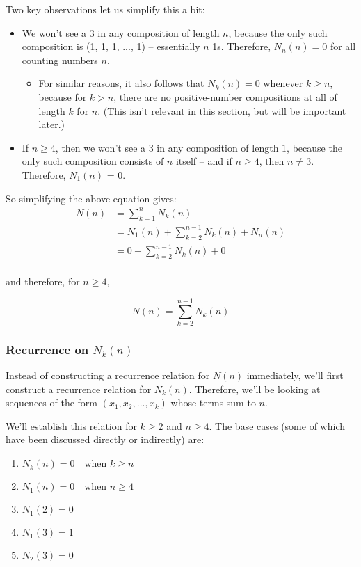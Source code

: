 Two key observations let us simplify this a bit:

\begin{itemize}
\item We won't see a 3 in any composition of length $n$, because the only such composition is (1, 1, 1, ..., 1) -- essentially $n$ 1s. Therefore, $N_n(n) = 0$ for all counting numbers $n$.
\begin{itemize}
\item For similar reasons, it also follows that $N_k(n) = 0$ whenever $k \geq n$, because for $k > n$, there are no positive-number compositions at all of length $k$ for $n$. (This isn't relevant in this section, but will be important later.)
\end{itemize}
\item If $n \geq 4$, then we won't see a 3 in any composition of length $1$, because the only such composition consists of $n$ itself -- and if $n \geq 4$, then $n \neq 3$. Therefore, $N_1(n)$ = 0. 
\end{itemize}

So simplifying the above equation gives:
\begin{align*}
N(n) &= \sum_{k=1}^{n} N_k(n) \\
&= N_1(n) + \sum_{k=2}^{n-1} N_k(n) + N_n(n) \\
&= 0 + \sum_{k=2}^{n-1} N_k(n) + 0 \\
\end{align*}

and therefore, for $n \geq 4$,

\begin{equation}
\label{composition-num-3s-n-nk}
N(n) = \sum_{k=2}^{n-1} N_k(n)
\end{equation}

\subsubsection{Recurrence on $N_k(n)$}

Instead of constructing a recurrence relation for $N(n)$ immediately, we'll first construct a recurrence relation for $N_k(n)$. Therefore, we'll be looking at sequences of the form $(x_1, x_2, ..., x_k)$ whose terms sum to $n$.

We'll establish this relation for $k \geq 2$ and $n \geq 4$. The base cases (some of which have been discussed directly or indirectly) are:

\begin{enumerate}
\item $N_k(n) = 0 \quad \text{when } k \geq n$ \label{eqbc-3s-1}
\item $N_1(n) = 0 \quad \text{when } n \geq 4$  \label{eqbc-3s-2}
\item $N_1(2) = 0$  \label{eqbc-3s-3}
\item $N_1(3) = 1$  \label{eqbc-3s-4}
\item $N_2(3) = 0$ \label{hooo}  \label{eqbc-3s-5}
\end{enumerate}


